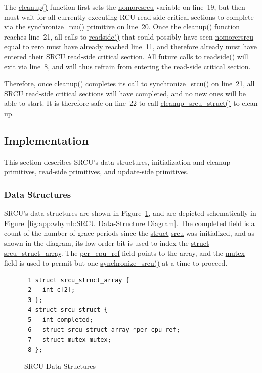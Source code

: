 The \url{cleanup()} function first sets the \url{nomoresrcu} variable
on line~19, but then must wait for all currently executing RCU read-side
critical sections to complete via the \url{synchronize_rcu()} primitive
on line~20.
Once the \url{cleanup()} function reaches line~21, all calls to
\url{readside()} that could possibly have seen \url{nomorersrcu} equal
to zero must have already reached line~11, and therefore already must
have entered their SRCU read-side critical section.
All future calls to \url{readside()} will exit via line~8, and will thus
refrain from entering the read-side critical section.

Therefore, once \url{cleanup()} completes its call to
\url{synchronize_srcu()} on line~21, all SRCU read-side critical sections
will have completed, and no new ones will be able to start.
It is therefore safe on line~22 to call \url{cleanup_srcu_struct()}
to clean up.

\subsection{Implementation}
\label{sec:app:rcuimpl:Implementation}

This section describes SRCU's data structures, initialization and 
cleanup primitives, read-side primitives, and update-side primitives.

\subsubsection{Data Structures}
\label{sec:app:rcuimpl:Data Structures}

SRCU's data structures are shown in
Figure~\ref{fig:app:rcuimpl:SRCU Data Structures},
and are depicted schematically in
Figure~\ref{fig:app:whymb:SRCU Data-Structure Diagram}.
The \url{completed} field is a count of the number of grace periods
since the \url{struct} \url{srcu} was initialized, and as shown in the
diagram, its low-order bit is used to index the
\url{struct} \url{srcu_struct_array}.
The \url{per_cpu_ref} field points to the array, and the
\url{mutex} field is used to permit but one \url{synchronize_srcu()} at
a time to proceed.

\begin{figure}[htbp]
{ \scriptsize
\begin{verbatim}
 1 struct srcu_struct_array {
 2   int c[2];
 3 };
 4 struct srcu_struct {
 5   int completed;
 6   struct srcu_struct_array *per_cpu_ref;
 7   struct mutex mutex;
 8 };
\end{verbatim}
}
\caption{SRCU Data Structures}
\label{fig:app:rcuimpl:SRCU Data Structures}
\end{figure}

